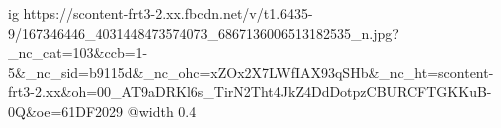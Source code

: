  
 
 
 
 

\ifcmt
  ig https://scontent-frt3-2.xx.fbcdn.net/v/t1.6435-9/167346446_4031448473574073_6867136006513182535_n.jpg?_nc_cat=103&ccb=1-5&_nc_sid=b9115d&_nc_ohc=xZOx2X7LWfIAX93qSHb&_nc_ht=scontent-frt3-2.xx&oh=00_AT9aDRKl6s_TirN2Tht4JkZ4DdDotpzCBURCFTGKKuB-0Q&oe=61DF2029
  @width 0.4
\fi
